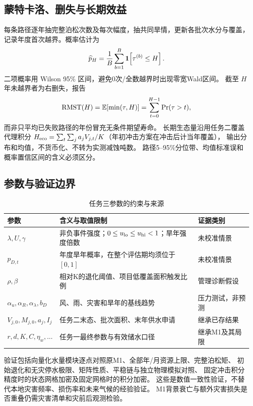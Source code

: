 \subsection{蒙特卡洛、删失与长期效益}\label{sec:mc}
每条路径逐年抽完整泊松次数及每次幅度，抽共同旱情，更新各批次水分与覆盖，
记录年度首次越界。概率估计为
\begin{equation}\label{eq:mc}
\widehat p_H=\frac1B\sum_{b=1}^B\mathbf{1}\!\left[\tau^{(b)}\le H\right].
\end{equation}
二项概率用 Wilson 95\% 区间，避免0次/全数越界时出现零宽Wald区间。
截至 $H$ 年未越界者为右删失，报告
\[
\mathrm{RMST}(H)=\mathbb{E}[\min(\tau,H)]=\sum_{t=0}^{H-1}\Pr(\tau>t),
\]
而非只平均已失败路径的年份冒充无条件期望寿命。
长期生态量沿用任务二覆盖代理积分
$H_{\rm eco}=\sum_t\sum_ja_jV_{j,t}/K$（年初冲击方案在冲击后计当年覆盖），
输出分布和均值，不货币化、不转为实测减蚀吨数。
路径5--95\%分位带、均值标准误和概率置信区间的含义必须区分。

\subsection{参数与验证边界}
\begin{table}[H]\centering\small
\begin{tabularx}{\textwidth}{lXl}
\toprule 参数 & 含义与取值限制 & 证据类别\\\midrule
$\lambda,U,\gamma$ & 非负事件强度；$0\le u_{\rm lo}\le u_{\rm hi}<1$；旱年强度倍数 & 未校准情景\\
$p_{D,t}$ & 年度旱年概率，在整个评估期均须位于$[0,1]$ & 未校准情景\\
$\rho,\beta$ & 相对K的退化阈值、项目低覆盖面积触发比例 & 管理诊断假设\\
$\alpha_u,\alpha_R,\alpha_\lambda,b_D$ & 风、雨、灾害和旱年的基线趋势 & 压力测试，非预测\\
$V_{j,0},M_{j,0},a_j,I_j$ & 任务二末态、批次面积、末年供水申请 & 继承已存结果\\
$r,d,K,C,\eta_w,\ldots$ & 任务一最终参数与有效储水口径 & 继承M1及其局限\\
\bottomrule
\end{tabularx}
\caption{任务三参数的约束与来源}\label{tab:t3par}
\end{table}

验证包括向量化水量模块逐点对照原M1、全部年/月资源上限、完整泊松矩、
初始退化和无灾停水极限、矩阵性质、平稳链与独立物理模拟对照、
固定冲击积分精度时的状态网格加密及固定网格时的积分加密。
这些是数值一致性验证，不替代本地灾害频率、损伤率和未来气候的经验验证。
M1背景衰亡与额外灾害损失是否重叠仍需灾害清单和灾前后观测检验。
